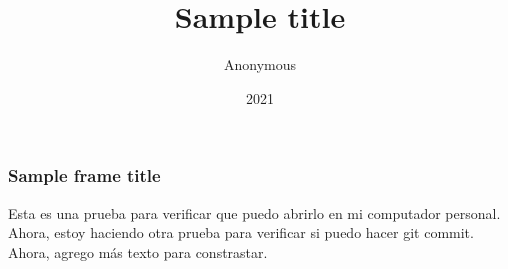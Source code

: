 \documentclass{beamer}
\title{Sample title}
\author{Anonymous}
\institute{Overleaf}
\date{2021}
\begin{document}
\frame{\titlepage}    

\begin{frame}
\frametitle{Sample frame title}
Esta es una prueba para verificar que puedo abrirlo en mi computador personal. Ahora, estoy haciendo otra prueba para verificar si puedo hacer git commit. Ahora, agrego más texto para constrastar.
\end{frame}
\end{document}
